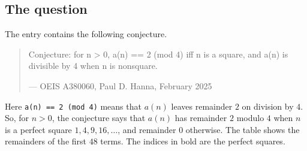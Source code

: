 \documentclass[11pt,a4paper]{article}
\theoremstyle{definition}
\theoremstyle{remark}
\begin{document}
\subsection{The question}
The entry contains the following conjecture.
\begin{quote}\small\ttfamily\raggedright Conjecture: for n > 0, a(n) == 2 (mod 4) iff n is a square, and a(n) is divisible by 4 when n is nonsquare.\par\smallskip\hfill\textrm{--- OEIS A380060, Paul D. Hanna, February 2025}\end{quote}

Here \texttt{a(n) == 2 (mod 4)} means that $a(n)$ leaves remainder $2$ on division by $4$. So, for $n>0$, the conjecture says that $a(n)$ has remainder $2$ modulo $4$ when $n$ is a perfect square
$1,4,9,16,\dots$, and remainder $0$ otherwise. The table shows the remainders of the first $48$ terms. The indices in
bold are the perfect squares.
\end{document}
